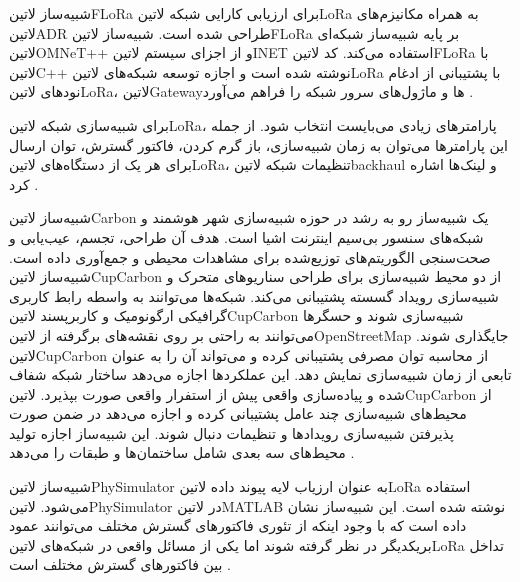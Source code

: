 
شبیه‌ساز ‌لاتین{FLoRa} برای ارزیابی کارایی شبکه ‌لاتین{LoRa} به همراه مکانیزم‌های ‌لاتین{ADR} طراحی شده است.
شبیه‌ساز ‌لاتین{FLoRa} بر پایه شبیه‌ساز شبکه‌ای ‌لاتین{OMNeT++} و از اجزای سیستم ‌لاتین{INET} استفاده می‌کند.
کد ‌لاتین{FLoRa} با ‌لاتین{C++} نوشته شده است و اجازه توسعه شبکه‌های ‌لاتین{LoRa} با پشتیبانی از ادغام
نودهای ‌لاتین{LoRa}، ‌لاتین{Gateway}ها و ماژول‌های سرور شبکه را فراهم می‌آورد
.

برای شبیه‌سازی شبکه ‌لاتین{LoRa}، پارامترهای زیادی می‌بایست انتخاب شود.
از جمله این پارامترها می‌توان به زمان شبیه‌سازی، باز گرم کردن، فاکتور گسترش، توان ارسال برای هر یک از دستگاه‌های ‌لاتین{LoRa}،
تنظیمات شبکه ‌لاتین{backhaul} و لینک‌ها اشاره کرد
.


شبیه‌ساز ‌لاتین{Carbon} یک شبیه‌ساز رو به رشد در حوزه شبیه‌سازی شهر هوشمند و شبکه‌های سنسور بی‌سیم اینترنت اشیا است.
هدف آن طراحی، تجسم، عیب‌یابی و صحت‌سنجی الگوریتم‌های توزیع‌شده برای مشاهدات محیطی و جمع‌آوری داده است.
شبیه‌ساز ‌لاتین{CupCarbon} از دو محیط شبیه‌سازی برای طراحی سناریوهای متحرک و شبیه‌سازی رویداد گسسته پشتیبانی می‌کند.
شبکه‌ها می‌توانند به واسطه رابط کاربری گرافیکی ارگونومیک و کاربرپسند ‌لاتین{CupCarbon} شبیه‌سازی شوند و حسگرها می‌توانند
به راحتی بر روی نقشه‌های برگرفته از ‌لاتین{OpenStreetMap} جایگذاری شوند.
‌لاتین{CupCarbon} از محاسبه توان مصرفی پشتیبانی کرده و می‌تواند آن را به عنوان تابعی از زمان شبیه‌سازی نمایش دهد.
این عملکردها اجازه می‌دهد ساختار شبکه شفاف شده و پیاده‌سازی واقعی پیش از استفرار واقعی صورت بپذیرد.
‌لاتین{CupCarbon} از محیط‌های شبیه‌سازی چند عامل پشتیبانی کرده و اجازه می‌دهد در ضمن صورت پذیرفتن شبیه‌سازی رویدادها و
تنظیمات دنبال شوند.
این شبیه‌ساز اجازه تولید محیط‌های سه بعدی شامل ساختمان‌ها و طبقات را می‌دهد
.


شبیه‌ساز ‌لاتین{PhySimulator} به عنوان ارزیاب لایه پیوند داده ‌لاتین{LoRa} استفاده می‌شود.
‌لاتین{PhySimulator} در ‌لاتین{MATLAB} نوشته شده است.
این شبیه‌ساز نشان داده است که با وجود اینکه از تئوری فاکتورهای گسترش مختلف می‌توانند عمود بریکدیگر در نظر گرفته شوند
اما یکی از مسائل واقعی در شبکه‌های ‌لاتین{LoRa} تداخل بین فاکتورهای گسترش مختلف است
.


